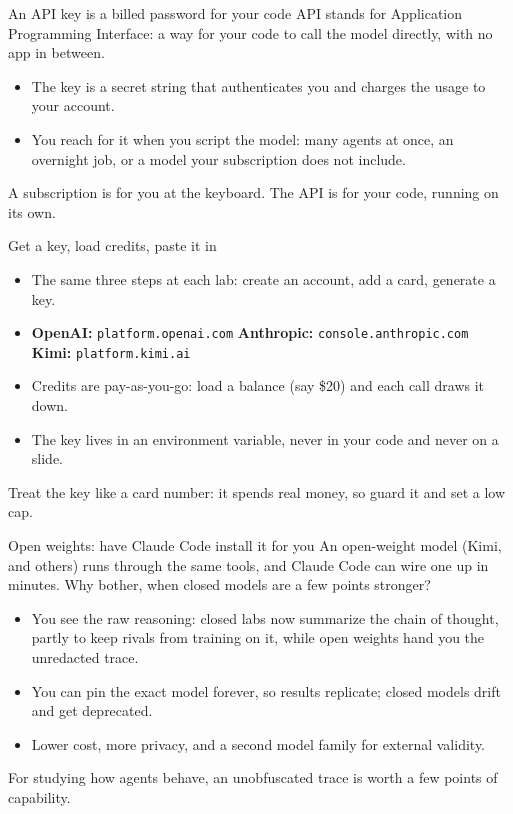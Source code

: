 \documentclass[aspectratio=169,11pt]{beamer}
\begin{document}
\begin{frame}{An API key is a billed password for your code}
API stands for Application Programming Interface: a way for your code to call the model directly, with no app in between.
\vspace{0.35cm}
\begin{itemize}\setlength\itemsep{0.3em}
    \item The key is a secret string that authenticates you and charges the usage to your account.
    \item You reach for it when you script the model: many agents at once, an overnight job, or a model your subscription does not include.
\end{itemize}
\vspace{0.4cm}
\alert{A subscription is for you at the keyboard. The API is for your code, running on its own.}
\end{frame}

\begin{frame}{Get a key, load credits, paste it in}
\begin{itemize}\setlength\itemsep{0.35em}
    \item The same three steps at each lab: create an account, add a card, generate a key.
    \item \textbf{OpenAI:} \texttt{platform.openai.com} \hfill \textbf{Anthropic:} \texttt{console.anthropic.com} \hfill \textbf{Kimi:} \texttt{platform.kimi.ai}
    \item Credits are pay-as-you-go: load a balance (say \$20) and each call draws it down.
    \item The key lives in an environment variable, never in your code and never on a slide.
\end{itemize}
\vspace{0.4cm}
\alert{Treat the key like a card number: it spends real money, so guard it and set a low cap.}
\end{frame}

\begin{frame}{Open weights: have Claude Code install it for you}
An open-weight model (Kimi, and others) runs through the same tools, and Claude Code can wire one up in minutes.
\vspace{0.3cm}
Why bother, when closed models are a few points stronger?
\begin{itemize}\setlength\itemsep{0.3em}
    \item You see the raw reasoning: closed labs now summarize the chain of thought, partly to keep rivals from training on it, while open weights hand you the unredacted trace.
    \item You can pin the exact model forever, so results replicate; closed models drift and get deprecated.
    \item Lower cost, more privacy, and a second model family for external validity.
\end{itemize}
\vspace{0.25cm}
\alert{For studying how agents behave, an unobfuscated trace is worth a few points of capability.}
\end{frame}
\end{document}
